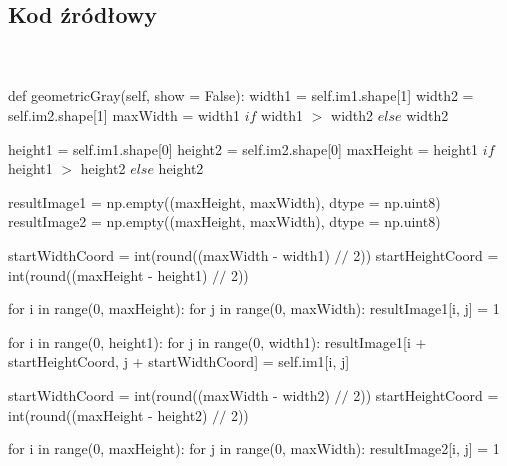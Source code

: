\documentclass[final,a4paper,openany,12pt]{mwbk}
\begin{document}
\subsection*{Kod źródłowy}
\hfill
\\\\
\noindent def geometricGray(self, show = False): \newline
\indent width1 = self.im1.shape[1] \newline
\indent width2 = self.im2.shape[1] \newline
\indent maxWidth = width1 $if$ width1 $>$ width2 $else$ width2 \newline

height1 = self.im1.shape[0] \newline
\indent height2 = self.im2.shape[0] \newline
\indent maxHeight = height1 $if$ height1 $>$ height2 $else$ height2 \newline

resultImage1 = np.empty((maxHeight, maxWidth), dtype = np.uint8)\newline
\indent resultImage2 = np.empty((maxHeight, maxWidth), dtype = np.uint8)\newline

startWidthCoord = int(round((maxWidth - width1) $//$ 2))\newline
\indent startHeightCoord = int(round((maxHeight - height1) $//$ 2))\newline

for i in range(0, maxHeight):\newline
\indent for j in range(0, maxWidth):\newline
\indent resultImage1[i, j] = 1\newline

\indent for i in range(0, height1):\newline
\indent for j in range(0, width1):\newline
\indent resultImage1[i + startHeightCoord, j + startWidthCoord] = self.im1[i, j]\newline

startWidthCoord = int(round((maxWidth - width2) $//$ 2))\newline
\indent startHeightCoord = int(round((maxHeight - height2) $//$ 2))\newline

for i in range(0, maxHeight):\newline
\indent for j in range(0, maxWidth):\newline
\indent resultImage2[i, j] = 1\newline
\end{document}
